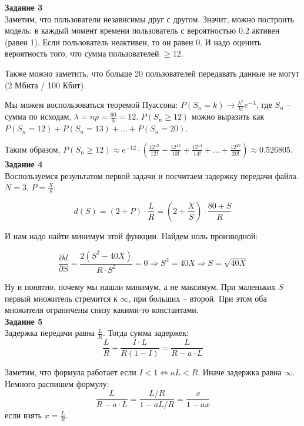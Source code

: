 \documentclass[11pt]{article}
\begin{document}
{\bf Задание 3}\\

Заметим, что пользователи независимы друг с другом.
Значит, можно построить модель: в каждый момент времени пользователь с вероятностью 0.2 активен (равен 1).
Если пользователь неактивен, то он равен 0.
И надо оценить вероятность того, что сумма пользователей $\geq 12$.

Также можно заметить, что больше 20 пользователей передавать данные не могут (2 Мбита / 100 Кбит).

Мы можем воспользоваться теоремой Пуассона: $P(S_n = k) \longrightarrow \frac{\lambda^k}{k!} e^{-\lambda}$, где $S_n$ -- сумма по исходам, $\lambda = np = \frac{60}{5} = 12$.
$P(S_n \geq 12)$ можно выразить как $P(S_n = 12) + P(S_n = 13) + ... + P(S_n = 20)$.

Таким образом, $P(S_n \geq 12) \approx e^{-12} \cdot \left( \frac{12^{12}}{12!} + \frac{12^{13}}{13!} + \frac{12^{14}}{14!} + ... + \frac{12^{20}}{20!} \right) \approx 0.526805$.\\

{\bf Задание 4}\\

Воспользуемся результатом первой задачи и посчитаем задержку передачи файла.
$N = 3$, $P = \frac{X}{S}$:

\[d(S) = \left(2 + P \right) \cdot \frac{L}{R} = \left(2 + \frac{X}{S} \right) \cdot \frac{80 + S}{R} \]

И нам надо найти минимум этой функции.
Найдем ноль производной:

\[ \frac{\partial d}{\partial S} = \frac{2 \left( S^2 - 40 X \right)}{R \cdot S^2} = 0 \Longrightarrow S^2 = 40X \Longrightarrow S = \sqrt {40X} \]

Ну и понятно, почему мы нашли минимум, а не максимум.
При маленьких $S$ первый множитель стремится к $\infty$, при больших -- второй.
При этом оба множителя ограничены снизу какими-то константами.\\

{\bf Задание 5}\\

    Задержка передачи равна $\frac{L}{R}$.
    Тогда сумма задержек:
    \[ \frac{L}{R} + \frac{I \cdot L}{R(1 - I)} = \frac{L}{R - a \cdot L} \]

    Заметим, что формула работает если $I < 1 \Longleftrightarrow aL < R $.
    Иначе задержка равна $\infty$.\\

    Немного распишем формулу:
    \[\frac{L}{R - a \cdot L} = \frac{L / R}{1 - a L / R} = \frac{x}{1 - ax} \]
    если взять $x = \frac{L}{R}$.
\end{document}
